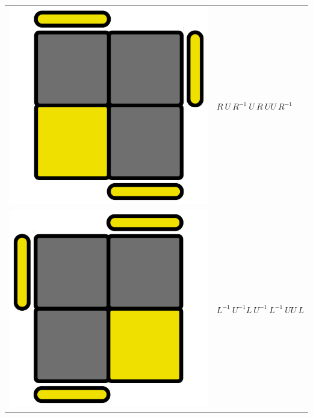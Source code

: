 \documentclass[12pt,a4paper, usenames, dvipsnames]{article}
\theoremstyle{mystyle}
\theoremstyle{definition}
\begin{document}
\begin{center}
\begin{tabular}{m{4cm} m{6cm}}
\includegraphics[scale=0.08]{TOPVIEW3_1.png} & $R \ U \ R^{-1} \ U \ R \ UU \ R^{-1}$ \\
\includegraphics[scale=0.08]{TOPVIEW3_2.png} & $L^{-1} \ U^{-1} L \ U^{-1} \ L^{-1} \ UU \ L$ \\

\end{tabular}
\end{center}
\end{document}
